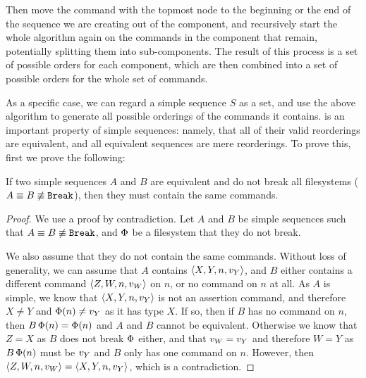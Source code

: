 Then move the command with the topmost node to the beginning or the end of
the sequence we are creating out of the component,
and recursively start the whole algorithm again on the commands in the component that remain,
potentially splitting them into sub-components.
The result of this process is a set of possible orders for each component,
which are then combined into a set of possible orders for the whole set of commands.

\bigskip

\noindent As a specific case, we can regard a simple sequence $S$
as a set, and use the above algorithm to generate all possible orderings
of the commands it contains.
 is
an important property of simple sequences: namely, that
all of their valid reorderings are equivalent,
and all equivalent sequences are mere reorderings.
To prove this, first we prove the following:

\begin{mylem}\label{equiv_simple_same_commands}
If two simple sequences $A$ and $B$ are equivalent
and do not break all filesystems ($A\equiv B\not\equiv\mathtt{Break}$),
then they must contain the same commands.
\end{mylem}
\begin{proof}
We use a proof by contradiction. Let $A$ and $B$ be simple sequences
such that $A\equiv B\not\equiv\mathtt{Break}$,
and $\Phi$ be a filesystem that they do not break.

We also assume that they do not contain the same commands.
Without loss of generality, we can assume
that $A$
contains $\langle{X,Y,n,v_Y}\rangle$, and $B$ either contains a different command
$\langle{Z,W,n,v_W}\rangle$ on $n$, or no command on $n$ at all.
As $A$ is simple, we know that $\langle{X,Y,n,v_Y}\rangle$ is not an assertion command,
and therefore $X\neq Y$ and $\Phi(n)\neq v_Y$ as it has type $X$.
If so, then if $B$ has no command on $n$, then $B\,\Phi(n)=\Phi(n)$ and
$A$ and $B$ cannot be equivalent.
Otherwise we know that $Z=X$ as $B$ does not break $\Phi$ either,
and that $v_W=v_Y$ and therefore $W=Y$ as $B\,\Phi(n)$ must
be $v_Y$ and $B$ only has one command on $n$.
However, then $\langle{Z,W,n,v_W}\rangle=\langle{X,Y,n,v_Y}\rangle$, which is a contradiction.
\end{proof}



